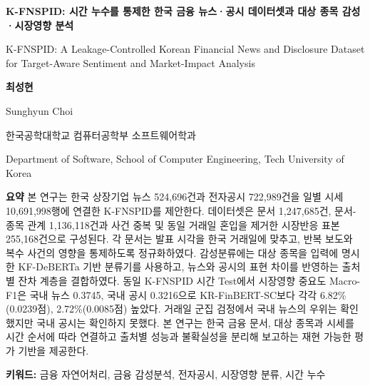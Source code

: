\documentclass[10pt]{article}
\newcommand{\dataset}{K-FNSPID}
\begin{document}
\thispagestyle{empty}

\begin{center}
\vspace*{5mm}
{\LARGE\bfseries K-FNSPID: 시간 누수를 통제한 한국 금융 뉴스·공시 데이터셋과 대상 종목 감성·시장영향 분석\par}
\vspace{3mm}
{\large K-FNSPID: A Leakage-Controlled Korean Financial News and Disclosure Dataset for Target-Aware Sentiment and Market-Impact Analysis\par}
\vspace{6mm}
{\large\bfseries 최성현\par}
{\normalsize Sunghyun Choi\par}
\vspace{1mm}
{\normalsize 한국공학대학교 컴퓨터공학부 소프트웨어학과\par}
{\small Department of Software, School of Computer Engineering, Tech University of Korea\par}
\end{center}

\vspace{6mm}
\noindent\textbf{요약}\quad
본 연구는 한국 상장기업 뉴스 524,696건과 전자공시 722,989건을 일별 시세 10,691,998행에 연결한 \dataset{}를 제안한다. 데이터셋은 문서 1,247,685건, 문서-종목 관계 1,136,118건과 사건 중복 및 동일 거래일 혼입을 제거한 시장반응 표본 255,168건으로 구성된다. 각 문서는 발표 시각을 한국 거래일에 맞추고, 반복 보도와 복수 사건의 영향을 통제하도록 정규화하였다. 감성분류에는 대상 종목을 입력에 명시한 KF-DeBERTa 기반 분류기를 사용하고, 뉴스와 공시의 표현 차이를 반영하는 출처별 잔차 계층을 결합하였다. 동일 K-FNSPID 시간 Test에서 시장영향 중요도 Macro-F1은 국내 뉴스 0.3745, 국내 공시 0.3216으로 KR-FinBERT-SC보다 각각 6.82\%(0.0239점), 2.72\%(0.0085점) 높았다. 거래일 군집 검정에서 국내 뉴스의 우위는 확인했지만 국내 공시는 확인하지 못했다. 본 연구는 한국 금융 문서, 대상 종목과 시세를 시간 순서에 따라 연결하고 출처별 성능과 불확실성을 분리해 보고하는 재현 가능한 평가 기반을 제공한다.

\vspace{1mm}
\noindent\textbf{키워드:} 금융 자연어처리, 금융 감성분석, 전자공시, 시장영향 분류, 시간 누수
\end{document}
